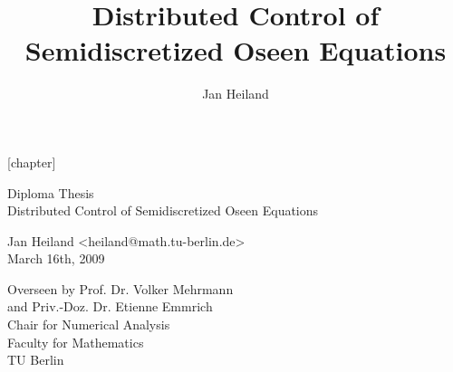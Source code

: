 \documentclass[a4paper,10pt,BCOR=15mm]{scrbook}
\title{Distributed Control of Semidiscretized Oseen Equations}
\author{Jan Heiland}
\begin{document}
\newtheorem{thm}{Theorem}[chapter]
\newtheorem{cor}[thm]{Corollary}
\newtheorem{lem}[thm]{Lemma}

\theoremstyle{plain}
\newtheorem{lema}[thm]{Lemma}


\theoremstyle{remark}
\newtheorem{exa}[thm]{Example}

\theoremstyle{remark}
\newtheorem{rem}[thm]{Remark}

\theoremstyle{definition}
\newtheorem{defin}[thm]{Definition}

\theoremstyle{plain}
\newtheorem{prob}[thm]{Problem}

\theoremstyle{plain}
\newtheorem{prop}[thm]{Proposition}

[chapter]





 \begin{titlepage} 
\vspace*{7cm} 
 \begin{center} 
  \large 
 Diploma Thesis\\  
\vspace{1cm} 
\Huge 
Distributed Control of Semidiscretized Oseen Equations\\ 
 \vspace{2cm} 
  \large 

 Jan Heiland <heiland@math.tu-berlin.de>\\ 
March 16th, 2009\\

\vspace{1cm}

 \normalsize 
 \vfill 
Overseen by
Prof. Dr. Volker Mehrmann \\
and Priv.-Doz. Dr. Etienne Emmrich\\
\vspace{0.3cm}
Chair for Numerical Analysis\\
\vspace{1cm}
Faculty for Mathematics \\
TU Berlin
 \end{center} 
\end{titlepage}

\end{document}

